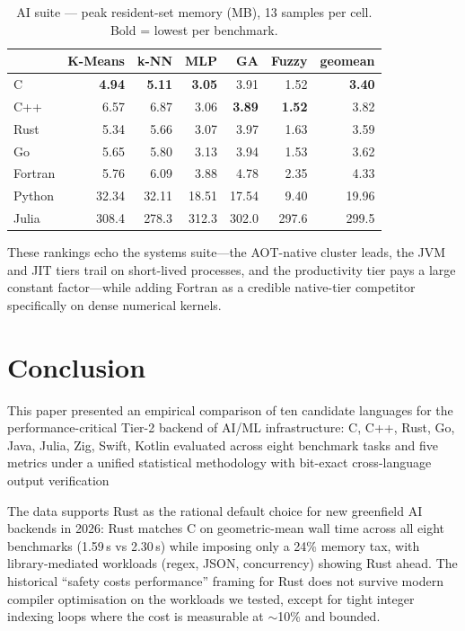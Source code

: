 \documentclass[10pt,conference]{IEEEtran}
\begin{document}
\begin{table}[t]
\caption{AI suite --- peak resident-set memory (MB), 13 samples per cell. Bold = lowest per benchmark.}
\label{tab:ai-m2}\centering\small
\begin{tabular}{l*{5}{r}r}
\toprule
 & \textbf{K-Means} & \textbf{k-NN} & \textbf{MLP} & \textbf{GA} & \textbf{Fuzzy} & \textbf{geomean} \\ \midrule
C & \textbf{4.94} & \textbf{5.11} & \textbf{3.05} & 3.91 & 1.52 & \textbf{3.40} \\
C++ & 6.57 & 6.87 & 3.06 & \textbf{3.89} & \textbf{1.52} & 3.82 \\
Rust & 5.34 & 5.66 & 3.07 & 3.97 & 1.63 & 3.59 \\
Go & 5.65 & 5.80 & 3.13 & 3.94 & 1.53 & 3.62 \\
Fortran & 5.76 & 6.09 & 3.88 & 4.78 & 2.35 & 4.33 \\
Python & 32.34 & 32.11 & 18.51 & 17.54 & 9.40 & 19.96 \\
Julia & 308.4 & 278.3 & 312.3 & 302.0 & 297.6 & 299.5 \\
\bottomrule\end{tabular}\end{table}

These rankings echo the systems suite---the AOT-native cluster leads, the JVM
and JIT tiers trail on short-lived processes, and the productivity tier pays a
large constant factor---while adding Fortran as a credible native-tier
competitor specifically on dense numerical kernels.

\section{Conclusion}
\label{sec:conclusion}

This paper presented an empirical comparison of ten candidate
languages for the performance-critical Tier-2 backend of AI/ML
infrastructure: C, C++, Rust, Go, Java, Julia, Zig, Swift, Kotlin evaluated across eight
benchmark tasks and five metrics under a unified statistical
methodology with bit-exact cross-language output verification


The data supports Rust as the rational default choice for new
greenfield AI backends in 2026: Rust matches C on geometric-mean
wall time across all eight benchmarks (1.59\,s vs 2.30\,s) while
imposing only a 24\% memory tax, with library-mediated workloads
(regex, JSON, concurrency) showing Rust ahead. The historical
``safety costs performance'' framing for Rust does not survive
modern compiler optimisation on the workloads we tested, except
for tight integer indexing loops where the cost is measurable at
$\sim$10\% and bounded.
\end{document}
